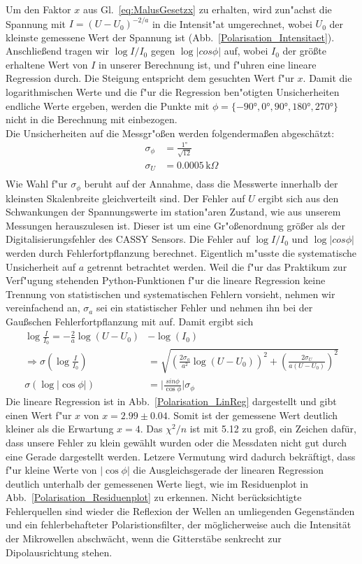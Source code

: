 \documentclass[12pt,a4paper]{article}
\begin{document}
Um den Faktor $x$ aus Gl.~\eqref{eq:MalusGesetzx} zu erhalten, wird zun"achst die Spannung mit $I=(U-U_0)^{-2/a}$ in die Intensit"at umgerechnet, wobei $U_0$ der kleinste gemessene Wert der Spannung ist (Abb.~\ref{Polarisation_Intensitaet}). Anschließend tragen wir $\log{I/I_0}$ gegen $\log{|cos{\phi}|}$ auf, wobei $I_0$ der größte erhaltene Wert von $I$ in unserer Berechnung ist, und f"uhren eine lineare Regression durch. Die Steigung entspricht dem gesuchten Wert f"ur $x$. Damit die logarithmischen Werte und die f"ur die Regression ben"otigten Unsicherheiten endliche Werte ergeben, werden die Punkte mit $\phi=\{\ang{-90},\ang{0},\ang{90},\ang{180},\ang{270}\}$ nicht in die Berechnung mit einbezogen.\\
Die Unsicherheiten auf die Messgr"o\ss en werden folgendermaßen abgeschätzt:
\begin{align*}
\sigma_\phi &= \frac{\ang{1}}{\sqrt{12}} \\
\sigma_U &= 0.0005\,\text{k}\Omega\\
\end{align*}
Wie Wahl f"ur $\sigma_{\phi}$ beruht auf der Annahme, dass die Messwerte innerhalb der kleinsten Skalenbreite gleichverteilt sind. Der Fehler auf $U$ ergibt sich aus den Schwankungen der Spannungswerte im station"aren Zustand, wie aus unserem Messungen herauszulesen ist. Dieser ist um eine Gr"o\ss enordnung größer als der Digitalisierungsfehler des CASSY Sensors.
Die Fehler auf $\log{I/I_0}$ und $\log{|cos{\phi}|}$ werden durch Fehlerfortpflanzung berechnet. Eigentlich m"usste die systematische Unsicherheit auf $a$ getrennt betrachtet werden. Weil die f"ur das Praktikum zur Verf"ugung stehenden Python-Funktionen f"ur die lineare Regression keine Trennung von statistischen und systematischen Fehlern vorsieht, nehmen wir vereinfachend an, $\sigma_a$ sei ein statistischer Fehler und nehmen ihn bei der Gaußschen Fehlerfortpflanzung mit auf. Damit ergibt sich
\begin{align}
\log{\frac{I}{I_0}}=-\frac{2}{a}\log(U-U_0)&-\log(I_0)\\
\Rightarrow\sigma(\log{\frac{I}{I_0}})&=\sqrt{\left(\frac{2\sigma_a}{a^2}\log(U-U_0)\right)^2+\left(\frac{2\sigma_U}{a(U-U_0)}\right)^2}\\
\sigma(\log|\cos{\phi}|)&=\Big|\frac{sin{\phi}}{\cos{\phi}}\Big|\sigma_{\phi}
\end{align} 
Die lineare Regression ist in Abb.~\ref{Polarisation_LinReg} dargestellt und gibt einen Wert f"ur $x$ von $x=2.99\pm0.04$. Somit ist der gemessene Wert deutlich kleiner als die Erwartung $x=4$. Das $\chi^2/n$ ist mit 5.12 zu gro\ss, ein Zeichen dafür, dass unsere Fehler zu klein gewählt wurden oder die Messdaten nicht gut durch eine Gerade dargestellt werden. Letzere Vermutung wird dadurch bekräftigt, dass f"ur kleine Werte von $|\cos{\phi}|$ die Ausgleichsgerade der linearen Regression deutlich unterhalb der gemessenen Werte liegt, wie im Residuenplot in Abb.~\ref{Polarisation_Residuenplot} zu erkennen. Nicht berücksichtigte Fehlerquellen sind wieder die Reflexion der Wellen an umliegenden Gegenständen und ein fehlerbehafteter Polaristionsfilter, der möglicherweise auch die Intensität der Mikrowellen abschwächt, wenn die Gitterstäbe senkrecht zur Dipolausrichtung stehen. 
\end{document}
